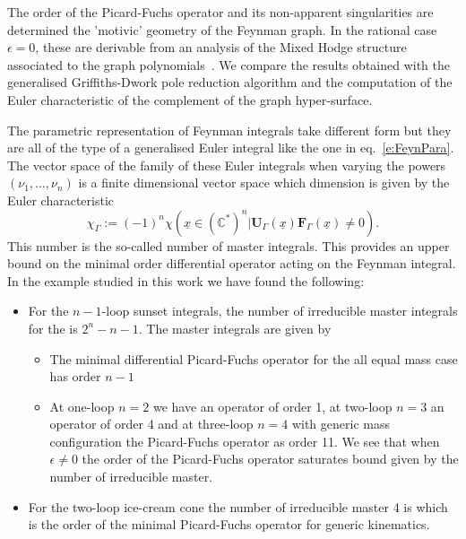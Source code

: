 \documentclass[a4paper,12pt]{article}
\numberwithin{equation}{section}
\numberwithin{figure}{section}
\begin{document}
The order of the Picard-Fuchs operator and its non-apparent
singularities are determined  the 'motivic' geometry of the Feynman
graph. In the rational case $\epsilon=0$, these are derivable from an
analysis of the Mixed Hodge structure associated to the graph
polynomials~\cite{bek,Brown:2009ta,Doran:2023yzu}.
We compare the results obtained with the generalised Griffiths-Dwork
pole reduction
algorithm and the computation of the Euler characteristic of the
complement of the graph hyper-surface.

The parametric representation of Feynman integrals take different form
but they are all of the type of a generalised Euler integral like the
one in eq.~\eqref{e:FeynPara}. The vector space of the family of these
Euler integrals when varying the powers $(\nu_1,\dots,\nu_n)$ is a
finite dimensional vector space which dimension is given by the Euler
characteristic~\cite{Lee:2013hzt,Bitoun:2017nre,Agostini:2022cgv}
\begin{equation}\label{e:chiGamma}
  \chi_\Gamma:=(-1)^n \chi\left(\underline x\in(\mathbb C^*)^n|
  \textbf{U}_\Gamma(\underline x)\textbf{F}_\Gamma(\underline
  x)\neq0\right).
\end{equation} This number is the so-called number of master
integrals. This provides an upper bound on the minimal order
differential operator acting on the Feynman integral. In the example
studied in this work we have found the following:

\begin{itemize}
\item  For the $n-1$-loop
  sunset integrals, the number of irreducible master integrals for the
  is $2^{n}-n-1$.  The master integrals are given by
  
\begin{itemize}  \item The minimal differential Picard-Fuchs operator for the all
    equal mass case has order  $n-1$
  \item At one-loop $n=2$ we have an operator of order 1, at two-loop
    $n=3$ an operator of order 4 and at three-loop $n=4$ with generic
    mass configuration the Picard-Fuchs operator
as   order 11.  We see that when $\epsilon\neq0$  the order of the
    Picard-Fuchs operator saturates bound given by the number of
    irreducible master.
  \end{itemize}
  \item For the two-loop ice-cream cone the number of irreducible
    master 4 is which is the order of the minimal Picard-Fuchs
    operator for generic kinematics.
  \end{itemize}
\end{document}
